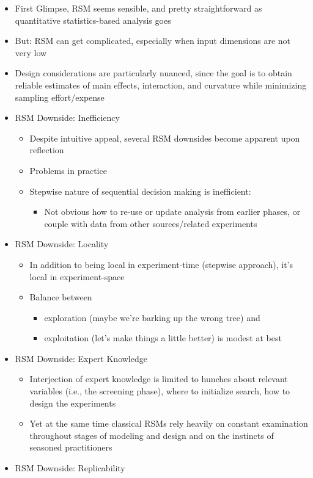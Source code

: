 \documentclass[
  letterpaper,
  DIV=11,
  numbers=noendperiod]{scrreprt}
\providecommand{\tightlist}{%
  \setlength{\itemsep}{0pt}\setlength{\parskip}{0pt}}\usepackage{longtable,booktabs,array}
\begin{document}
\begin{itemize}
\item
  First Glimpse, RSM seems sensible, and pretty straightforward as
  quantitative statistics-based analysis goes
\item
  But: RSM can get complicated, especially when input dimensions are not
  very low
\item
  Design considerations are particularly nuanced, since the goal is to
  obtain reliable estimates of main effects, interaction, and curvature
  while minimizing sampling effort/expense
\item
  RSM Downside: Inefficiency

  \begin{itemize}
  \tightlist
  \item
    Despite intuitive appeal, several RSM downsides become apparent upon
    reflection
  \item
    Problems in practice
  \item
    Stepwise nature of sequential decision making is inefficient:

    \begin{itemize}
    \tightlist
    \item
      Not obvious how to re-use or update analysis from earlier phases,
      or couple with data from other sources/related experiments
    \end{itemize}
  \end{itemize}
\item
  RSM Downside: Locality

  \begin{itemize}
  \tightlist
  \item
    In addition to being local in experiment-time (stepwise approach),
    it's local in experiment-space
  \item
    Balance between

    \begin{itemize}
    \tightlist
    \item
      exploration (maybe we're barking up the wrong tree) and
    \item
      exploitation (let's make things a little better) is modest at best
    \end{itemize}
  \end{itemize}
\item
  RSM Downside: Expert Knowledge

  \begin{itemize}
  \tightlist
  \item
    Interjection of expert knowledge is limited to hunches about
    relevant variables (i.e., the screening phase), where to initialize
    search, how to design the experiments
  \item
    Yet at the same time classical RSMs rely heavily on constant
    examination throughout stages of modeling and design and on the
    instincts of seasoned practitioners
  \end{itemize}
\item
  RSM Downside: Replicability


\end{itemize}
\end{document}
